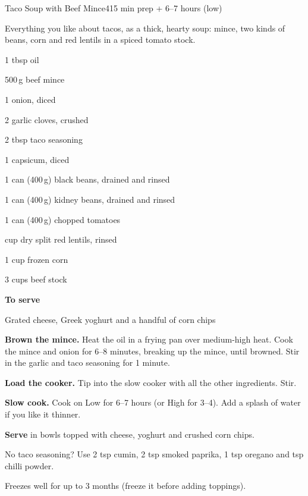 \begin{recipebox}{Taco Soup with Beef Mince}{4}{15 min prep + 6--7 hours (low)}

Everything you like about tacos, as a thick, hearty soup: mince, two kinds of
beans, corn and red lentils in a spiced tomato stock.

\begin{ingredients}
  \item 1 tbsp oil
  \item 500\,g beef mince
  \item 1 onion, diced
  \item 2 garlic cloves, crushed
  \item 2 tbsp taco seasoning
  \item 1 capsicum, diced
  \item 1 can (400\,g) black beans, drained and rinsed
  \item 1 can (400\,g) kidney beans, drained and rinsed
  \item 1 can (400\,g) chopped tomatoes
  \item {} cup dry split red lentils, rinsed
  \item 1 cup frozen corn
  \item 3 cups beef stock
  \item[] \textbf{To serve}
  \item Grated cheese, Greek yoghurt and a handful of corn chips
\end{ingredients}

\begin{method}
  \item \textbf{Brown the mince.} Heat the oil in a frying pan over medium-high heat.
        Cook the mince and onion for 6--8 minutes, breaking up the mince, until
        browned. Stir in the garlic and taco seasoning for 1 minute.
  \item \textbf{Load the cooker.} Tip into the slow cooker with all the other
        ingredients. Stir.
  \item \textbf{Slow cook.} Cook on Low for 6--7 hours (or High for 3--4). Add a
        splash of water if you like it thinner.
  \item \textbf{Serve} in bowls topped with cheese, yoghurt and crushed corn chips.
\end{method}

\begin{notelist}
  \item No taco seasoning? Use 2 tsp cumin, 2 tsp smoked paprika, 1 tsp oregano and
         tsp chilli powder.
  \item Freezes well for up to 3 months (freeze it before adding toppings).
\end{notelist}

\end{recipebox}

